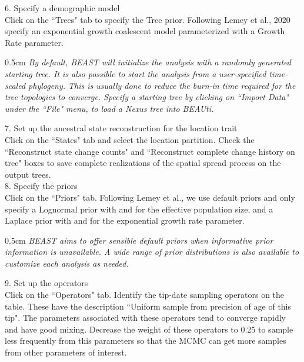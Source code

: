 \documentclass{article}
\newcommand{\ann}[1]{
\begin{adjustwidth}{0.5cm}{}
\it{#1}\\
\end{adjustwidth}}
\newcommand{\code}[1]{
{\upshape\ttfamily{#1}}}
\begin{document}
6. Specify a demographic model\\

Click on the ``Trees" tab to specify the Tree prior. Following Lemey et al., 2020 specify an exponential growth coalescent model parameterized with a Growth Rate parameter. \\

\ann{By default, BEAST will initialize the analysis with a randomly generated starting tree. It is also possible to start the analysis from a user-specified time-scaled phylogeny. This is usually done to reduce the burn-in time required for the tree topologies to converge. Specify a starting tree by clicking on ``Import Data" under the ``File" menu, to load a Nexus tree into BEAUti.}

7. Set up the ancestral state reconstruction for the location trait\\

Click on the ``States" tab and select the location partition. Check the ``Reconstruct state change counts" and ``Reconstruct complete change history on tree" boxes to save complete realizations of the spatial spread process on the output trees.\\

8. Specify the priors \\

Click on the ``Priors" tab. Following Lemey et al., we use default priors and only specify a Lognormal prior with \code{mu=0} and \code{sigma=10} for the effective population size, and a Laplace prior with \code{mean=0} and \code{scale=100} for the exponential growth rate parameter.\\

\ann{BEAST aims to offer sensible default priors when informative prior information is unavailable. A wide range of prior distributions is also available to customize each analysis as needed.}

9. Set up the operators \\

Click on the ``Operators" tab. Identify the tip-date sampling operators on the table. These have the description ``Uniform sample from precision of age of this tip". The parameters associated with these operators tend to converge rapidly and have good mixing. Decrease the weight of these operators to 0.25 to sample less frequently from this parameters so that the MCMC can get more samples from other parameters of interest.\\
\end{document}
